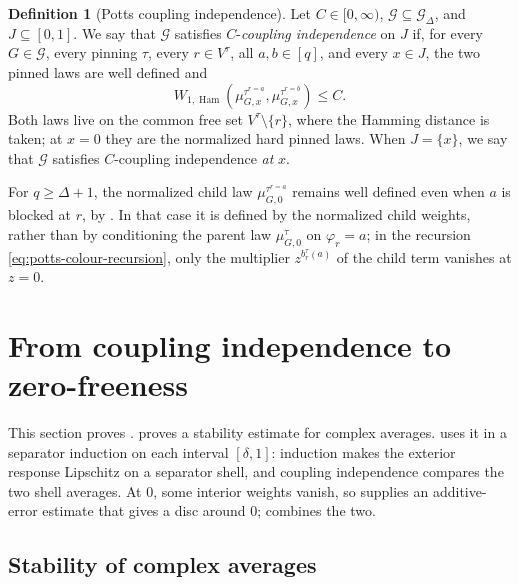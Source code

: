 \documentclass[11pt,reqno]{article}
\theoremstyle{plain}
\theoremstyle{definition}
\newtheorem{definition}[theorem]{Definition}
\theoremstyle{remark}
\theoremstyle{definition}
\newtheorem{definition}[definition]{Definition}
\theoremstyle{remark}
\DeclareMathOperator{\Ham}{Ham}
\newcommand{\Deg}{\Delta}                        %
\newcommand{\WHam}{W_{1,\Ham}}                   %
\newcommand{\colours}{[q]}                        %
\newcommand{\bcount}{b}
\newcommand{\Gdeg}{\mathcal{G}_{\Deg}}
\newcommand{\mupin}[3]{\mu_{#1,#3}^{#2}}
\begin{document}
\begin{definition}[Potts coupling independence]\label{def:potts-ci}
Let \(C\in[0,\infty)\), \(\mathcal G\subseteq\Gdeg\), and
\(J\subseteq[0,1]\).  We say that
\(\mathcal G\) satisfies \(C\)-\emph{coupling independence} on \(J\) if,
for every \(G\in\mathcal G\), every pinning \(\tau\), every
\(r\in V^\tau\), all \(a,b\in\colours\), and every \(x\in J\), the two
pinned laws are well defined and
\begin{equation}\label{eq:potts-ci}
  \WHam\!\left(
    \mupin{G}{\tau^{r=a}}{x},
    \mupin{G}{\tau^{r=b}}{x}
  \right)\le C.
\end{equation}
Both laws live on the common free set \(V^\tau\setminus\{r\}\), where the
Hamming distance is taken; at \(x=0\) they are the normalized hard pinned
laws.  When
\(J=\{x\}\), we say that \(\mathcal G\) satisfies \(C\)-coupling
independence \emph{at} \(x\).
\end{definition}

For \(q\ge\Deg+1\), the normalized child law \(\mupin{G}{\tau^{r=a}}{0}\)
remains well defined even when \(a\) is blocked at \(r\), by
.  In that case it is defined by the normalized child
weights, rather than by conditioning the parent law \(\mupin{G}{\tau}{0}\)
on \(\varphi_r=a\); in the recursion \eqref{eq:potts-colour-recursion},
only the multiplier \(z^{\bcount_r^\tau(a)}\) of the child term vanishes
at \(z=0\).

\section{From coupling independence to zero-freeness}
\label{sec:transfer-principle}

This section proves .
 proves a stability estimate for complex
averages.   uses it in a separator induction
on each interval \([\delta,1]\): induction makes the exterior response
Lipschitz on a separator shell, and coupling independence compares the
two shell averages.  At \(0\), some interior weights vanish, so
 supplies an additive-error estimate that gives a
disc around \(0\);  combines the two.

\subsection{Stability of complex averages}\label{sec:complex-average}
\end{document}
